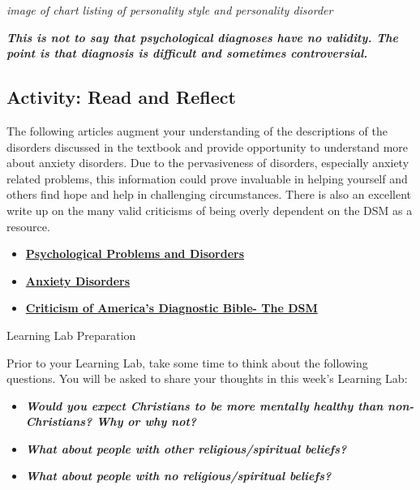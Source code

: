 \documentclass[
]{book}
\providecommand{\tightlist}{%
  \setlength{\itemsep}{0pt}\setlength{\parskip}{0pt}}
\begin{document}
\emph{image of chart listing of personality style and personality disorder}

\textbf{\emph{This is not to say that psychological diagnoses have no validity. The point is that diagnosis is difficult and sometimes controversial.}}

\hypertarget{activity-read-and-reflect-15}{%
\subsection*{Activity: Read and Reflect}\label{activity-read-and-reflect-15}}

\begin{reflect}
The following articles augment your understanding of the descriptions of the disorders discussed in the textbook and provide opportunity to understand more about anxiety disorders. Due to the pervasiveness of disorders, especially anxiety related problems, this information could prove invaluable in helping yourself and others find hope and help in challenging circumstances. There is also an excellent write up on the many valid criticisms of being overly dependent on the DSM as a resource.

\begin{itemize}
\tightlist
\item
  \href{https://psychologyinfo.com/}{\textbf{Psychological Problems and Disorders}}\\
\item
  \href{https://psychologyinfo.com/}{\textbf{Anxiety Disorders}}\\
\item
  \href{https://www.pchtreatment.com/dsm-5-issues/}{\textbf{Criticism of America's Diagnostic Bible- The DSM}}
\end{itemize}

{Learning Lab Preparation}

Prior to your Learning Lab, take some time to think about the following questions. You will be asked to share your thoughts in this week's Learning Lab:

\begin{itemize}
\tightlist
\item
  \textbf{\emph{Would you expect Christians to be more mentally healthy than non-Christians? Why or why not?}}\\
\item
  \textbf{\emph{What about people with other religious/spiritual beliefs?}}\\
\item
  \textbf{\emph{What about people with no religious/spiritual beliefs?}}
\end{itemize}
\end{reflect}
\end{document}
